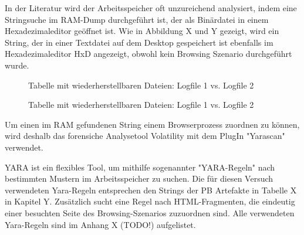 In der Literatur wird der Arbeitsspeicher oft unzureichend analysiert, indem eine Stringsuche im RAM-Dump durchgeführt ist, der als Binärdatei in einem Hexadezimaleditor geöffnet ist. \cite{Rochmadi.2017, Md.2018, Montasari.2015}
Wie in Abbildung X und Y gezeigt, wird ein String, der in einer Textdatei auf dem Desktop gespeichert ist ebenfalls im Hexadezimaleditor HxD angezeigt, obwohl kein Browsing Szenario durchgeführt wurde.
\begin{figure}[h!]
	\centerline{}
	\caption{Tabelle mit wiederherstellbaren Dateien: Logfile 1 vs. Logfile 2}
\end{figure}
\begin{figure}[h!]
	\caption{Tabelle mit wiederherstellbaren Dateien: Logfile 1 vs. Logfile 2}
\end{figure}

Um einen im RAM gefundenen String einem Browserprozess zuordnen zu können, wird deshalb das forensiche Analysetool Volatility mit dem PlugIn "Yarascan" verwendet.

YARA ist ein flexibles Tool, um mithilfe sogenannter "YARA-Regeln" nach bestimmten Mustern im Arbeitsspeicher zu suchen.
Die für diesen Versuch verwendeten Yara-Regeln entsprechen den Strings der PB Artefakte in Tabelle X in Kapitel Y. Zusätzlich sucht eine Regel nach HTML-Fragmenten, die eindeutig einer besuchten Seite des Browsing-Szenarios zuzuordnen sind. \cite{Said.2011}
Alle verwendeten Yara-Regeln sind im Anhang X (TODO!) aufgelistet.

